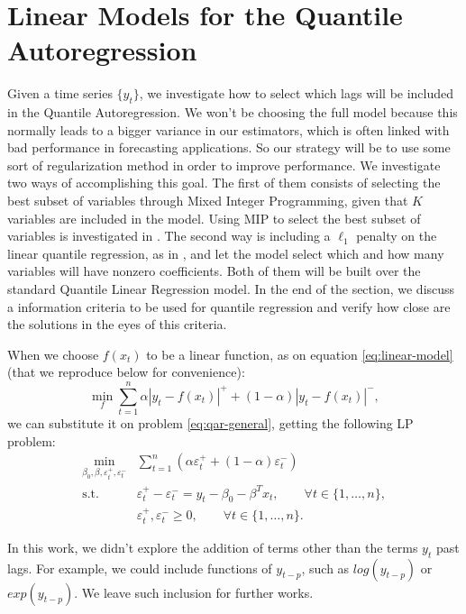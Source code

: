 \section{Linear Models for the Quantile Autoregression}
\label{sec:linear-models}

Given a time series $\{y_t\}$, we investigate how to select which lags will be included in the Quantile Autoregression. We won't be choosing the full model because this normally leads to a bigger variance in our estimators, which is often linked with bad performance in forecasting applications. So our strategy will be to use some sort of regularization method in order to improve performance.
We investigate two ways of accomplishing this goal.
The first of them consists of selecting the best subset of variables through Mixed Integer Programming, given that $K$ variables are included in the model. Using MIP to select the best subset of variables is investigated in \cite{bertsimas2015best}. The second way is including a $\ell_1$ penalty on the linear quantile regression, as in \cite{kim2009ell_1}, and let the model select which and how many variables will have nonzero coefficients. 
Both of them will be built over the standard Quantile Linear Regression model. In the end of the section, we discuss a information criteria to be used for quantile regression and verify how close are the solutions in the eyes of this criteria.

When we choose $f(x_t)$ to be a linear function, as on equation \ref{eq:linear-model} (that we reproduce below for convenience):
\begin{equation}
\min_{f}\sum_{t=1}^{n}\alpha|y_{t}-f(x_t)|^{+}+(1-\alpha)|y_{t}-f(x_t)|^{-},
\end{equation}
we can substitute it on problem \ref{eq:qar-general}, getting the following LP problem:
\begin{equation}
\begin{aligned}\min_{\beta_0,\beta,\varepsilon_{t}^{+},\varepsilon_{t}^{-}} & \sum_{t=1}^{n}\left(\alpha\varepsilon_{t}^{+}+(1-\alpha)\varepsilon_{t}^{-}\right)\\
\mbox{s.t. } & \varepsilon_{t}^{+}-\varepsilon_{t}^{-}=y_{t} - \beta_0 - \beta^T x_{t},\qquad\forall t\in\{1,\dots,n\},\\
& \varepsilon_t^+,\varepsilon_t^- \geq 0, \qquad \forall t \in \{1,\dots,n\}.
\end{aligned}
\label{eq:qar-lp}
\end{equation}

In this work, we didn't explore the addition of terms other than the terms $y_t$ past lags. For example, we could include functions of $y_{t-p}$, such as $log(y_{t-p})$ or $exp(y_{t-p})$. We leave such inclusion for further works. 

